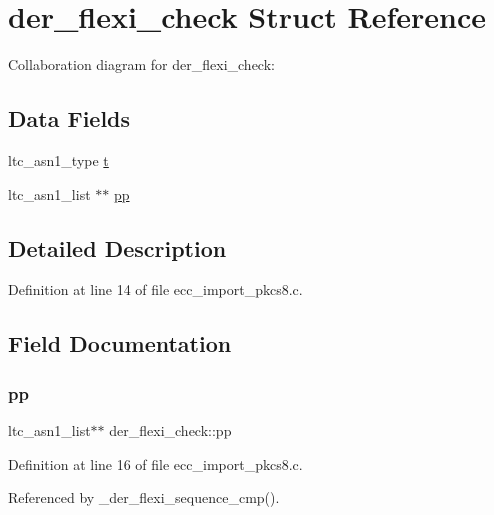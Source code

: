 \hypertarget{structder__flexi__check}{}\section{der\+\_\+flexi\+\_\+check Struct Reference}
\label{structder__flexi__check}


Collaboration diagram for der\+\_\+flexi\+\_\+check\+:
\subsection*{Data Fields}
\begin{DoxyCompactItemize}
\item 
ltc\+\_\+asn1\+\_\+type \mbox{\hyperlink{structder__flexi__check_a8bdd657fe9e66b21a82e06b477468498}{t}}
\item 
ltc\+\_\+asn1\+\_\+list $\ast$$\ast$ \mbox{\hyperlink{structder__flexi__check_a0efc09196fb719ae5c2a468fb01b077a}{pp}}
\end{DoxyCompactItemize}


\subsection{Detailed Description}


Definition at line 14 of file ecc\+\_\+import\+\_\+pkcs8.\+c.



\subsection{Field Documentation}
\mbox{\label{structder__flexi__check_a0efc09196fb719ae5c2a468fb01b077a}} 
\subsubsection{\texorpdfstring{pp}{pp}}
{\footnotesize\ttfamily ltc\+\_\+asn1\+\_\+list$\ast$$\ast$ der\+\_\+flexi\+\_\+check\+::pp}



Definition at line 16 of file ecc\+\_\+import\+\_\+pkcs8.\+c.



Referenced by \+\_\+der\+\_\+flexi\+\_\+sequence\+\_\+cmp().

\mbox{\label{structder__flexi__check_a8bdd657fe9e66b21a82e06b477468498}} 
